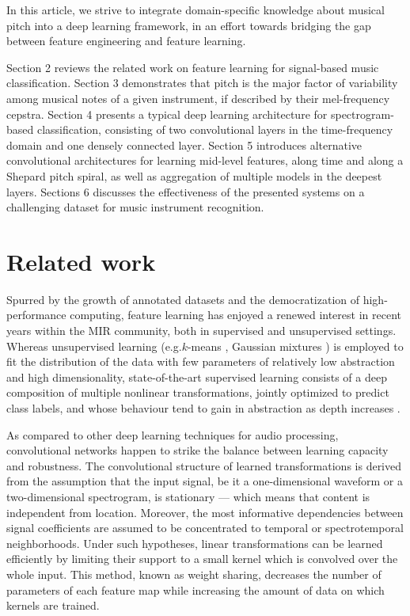 \documentclass{article}
\makeatletter
\newcommand*{\eg}{e.g.\@\xspace}
\makeatother
\begin{document}
In this article, we strive to integrate domain-specific knowledge about musical
pitch into a deep learning framework, in an effort towards bridging the gap
between feature engineering and feature learning.

Section 2 reviews the related work on feature learning for signal-based music
classification.
Section 3 demonstrates that pitch is the major factor of variability among musical
notes of a given instrument, if described by their mel-frequency cepstra.
Section 4 presents a typical deep learning architecture for spectrogram-based
classification, consisting of two convolutional layers in the time-frequency
domain and one densely connected layer.
Section 5 introduces alternative convolutional architectures for learning
mid-level features, along time and along a Shepard pitch spiral, as well as
aggregation of multiple models in the deepest layers.
Sections 6 discusses the effectiveness of the presented systems on a challenging
dataset for music instrument recognition.

\section{Related work}
Spurred by the growth of annotated datasets and the democratization of
high-performance computing, feature learning has enjoyed a renewed interest
in recent years within the MIR community, both in supervised and unsupervised
settings.
Whereas unsupervised learning (\eg $k$-means \cite{Stowell2014}, Gaussian
mixtures \cite{Joder2009}) is employed to fit the distribution of the data with
few parameters of relatively low abstraction
and high dimensionality, state-of-the-art supervised learning consists of a deep
composition of multiple nonlinear transformations, jointly optimized
to predict class labels, and whose behaviour tend to gain in abstraction as depth
increases \cite{vandenOord2013}.

As compared to other deep learning techniques for audio processing,
convolutional networks happen to strike the balance between
learning capacity and robustness.
The convolutional structure of learned transformations is derived from
the assumption that the input signal, be it a one-dimensional waveform
or a two-dimensional spectrogram, is stationary --- which means that
content is independent from location.
Moreover, the most informative dependencies between signal coefficients
are assumed to be concentrated to temporal or spectrotemporal neighborhoods.
Under such hypotheses, linear transformations can be learned efficiently
by limiting their support to a small kernel which is convolved over
the whole input.
This method, known as weight sharing, decreases the number of parameters
of each feature map while increasing the amount of data on which kernels are
trained.
\end{document}
